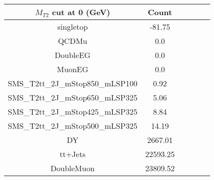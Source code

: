 \documentclass[8pt]{article}
\begin{document}
\begin{tabular}{|c|c|c|c|c|c|}
\hline
$M_{T2}$ cut at 0 (GeV) & Count \\
\hline
\hline
singletop & -81.75\\
QCDMu & 0.0\\
DoubleEG & 0.0\\
MuonEG & 0.0\\
SMS\_T2tt\_2J\_mStop850\_mLSP100 & 0.92\\
SMS\_T2tt\_2J\_mStop650\_mLSP325 & 5.06\\
SMS\_T2tt\_2J\_mStop425\_mLSP325 & 8.84\\
SMS\_T2tt\_2J\_mStop500\_mLSP325 & 14.19\\
DY & 2667.01\\
tt+Jets & 22593.25\\
DoubleMuon & 23809.52\\
\hline
\hline
\end{tabular}
\end{document}
